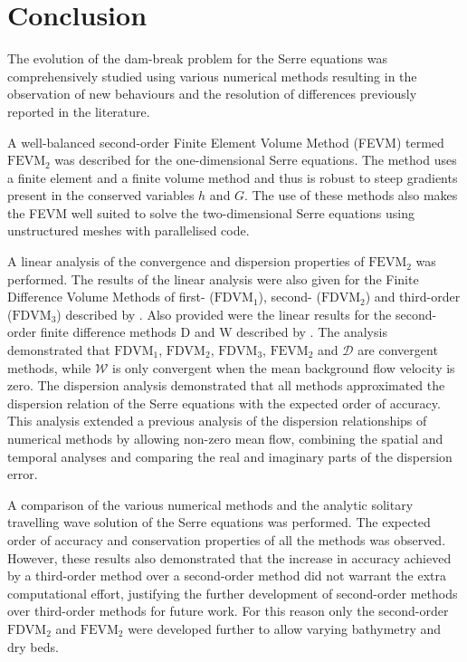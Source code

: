 
\chapter{Conclusion}
\label{chp:Conclusion}



The evolution of the dam-break problem for the Serre equations was comprehensively studied using various numerical methods resulting in the observation of new behaviours and the resolution of differences previously reported in the literature.  

A well-balanced second-order Finite Element Volume Method (FEVM) termed $\text{FEVM}_2$ was described for the one-dimensional Serre equations. The method uses a finite element and a finite volume method and thus is robust to steep gradients present in the conserved variables $h$ and $G$. The use of these methods also makes the FEVM well suited to solve the two-dimensional Serre equations using unstructured meshes with parallelised code.  

A linear analysis of the convergence and dispersion properties of $\text{FEVM}_2$ was performed. The results of the linear analysis were also given for the Finite Difference Volume Methods of first- ($\text{FDVM}_1$), second- ($\text{FDVM}_2$) and third-order ($\text{FDVM}_3$) described by \citet{Zoppou-etal-2017}. Also provided were the linear results for the second-order finite difference methods $\text{D}$ and $\text{W}$ described by \citet{Pitt-2018-61}. The analysis demonstrated that $\text{FDVM}_1$, $\text{FDVM}_2$, $\text{FDVM}_3$, $\text{FEVM}_2$ and $\mathcal{D}$ are convergent methods, while $\mathcal{W}$ is only convergent when the mean background flow velocity is zero. The dispersion analysis demonstrated that all methods approximated the dispersion relation of the Serre equations with the expected order of accuracy. This analysis extended a previous analysis of the dispersion relationships of numerical methods \cite{Filippini-etal-2016-381} by allowing non-zero mean flow, combining the spatial and temporal analyses and comparing the real and imaginary parts of the dispersion error. 

A comparison of the various numerical methods and the analytic solitary travelling wave solution of the Serre equations was performed. The expected order of accuracy and conservation properties of all the methods was observed. However, these results also demonstrated that the increase in accuracy achieved by a third-order method over a second-order method did not warrant the extra computational effort, justifying the further development of second-order methods over third-order methods for future work. For this reason only the second-order $\text{FDVM}_2$ and $\text{FEVM}_2$ were developed further to allow varying bathymetry and dry beds.

